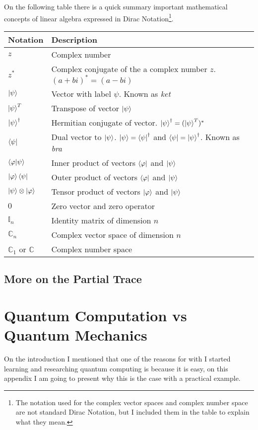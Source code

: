 On the following table there is a quick summary important mathematical concepts of linear algebra expressed in Dirac Notation\footnote{The notation used for the complex vector spaces and complex number space are not standard Dirac Notation, but I included them in the table to explain what they mean.}. 

\begin{tabular}{ p{2cm}|p{12cm} }
	\hline
	Notation & Description \\
	\hline
	\hline
	$z$ & Complex number    \\
	$z^{*}$ & Complex conjugate of the a complex number $z$. $(a+ bi)^{*} = (a -bi)$\\
	$\ket{\psi} $ & Vector with label $\psi$. Known as \textit{ket}\\
	$\ket{\psi}^T$ & Transpose of vector $\ket{\psi}$ \\
	$\ket{\psi}^\dag $ &  Hermitian conjugate of vector. $\ket{\psi}^\dag = (\ket{\psi}^T)^* $\\
	$\bra{\psi} $ & Dual vector to $\ket{\psi}$. $ \ket{\psi} = \bra{\psi}^{\dag}$ and $\bra{\psi} = \ket{\psi}^\dag$. Known as \textit{bra}\\
	$ \bra{\varphi}\ket{\psi} $ & Inner product of vectors $\bra{\varphi}$ and $\ket{\psi}$ \\
	$ \ket{\varphi}\bra{\psi} $ & Outer product of vectors $\bra{\varphi}$ and $\ket{\psi}$ \\
	$ \ket{\psi}\otimes\ket{\varphi}$ & Tensor product of vectors $\ket{\varphi}$ and $\ket{\psi}$ \\
	$ 0 $ & Zero vector and zero operator \\
	$ \mathbb{I}_n $ & Identity matrix of dimension $n$ \\
	$ \mathbb{C}_n $ & Complex vector space of dimension $n$ \\
	$ \mathbb{C}_1$ or $\mathbb{C} $ & Complex number space \\
	
\end{tabular}
\section{More on the Partial Trace}

\chapter{Quantum Computation vs Quantum Mechanics}
On the introduction I mentioned that one of the reasons for with I started learning and researching quantum computing is because it is easy, on this appendix I am going to present why this is the case with a practical example.

